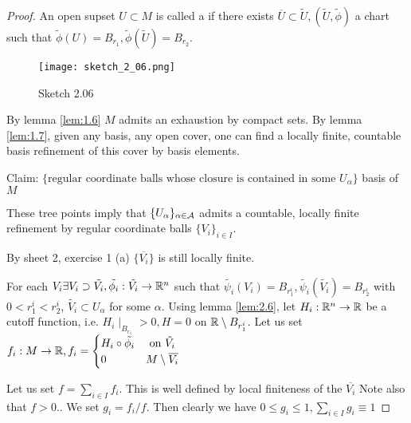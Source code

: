 \begin{proof} %
     An open supset \(U\subset M\) is called a  if there 
    exists \(\overline{U}\subset\tilde{U},(\tilde{U},\tilde{\phi})\) a chart such that 
    \(\tilde{\phi}(U)=B_{r_1},\tilde{\phi}(\tilde{U})=B_{r_2}\). 
    \begin{figure}[H]
        \centering
        \texttt{[image: sketch\_2\_06.png]}
        \caption{Sketch 2.06}
    \end{figure}
    By lemma \ref{lem:1.6} \(M\) admits an exhaustion by compact sets. By lemma \ref{lem:1.7}, given 
    any basis, any open cover, one can find a locally finite, countable basis refinement of this cover by basis elements.

    Claim: \(\{\text{regular coordinate balls whose closure is contained in some }U_\alpha\}\) basis of \(M\) 

    These tree points imply that \(\{U_\alpha\}_{\alpha\in\mathcal{A}}\) admits a countable, locally finite refinement by regular coordinate balls \(\{V_i\}_{i\in I}\).

    By sheet 2, exercise 1 (a) \(\{\overline{V_i}\}\) is still locally finite.

     For each \(V_i\exists V_i\supset \tilde{V_i},\tilde{\phi_i}:\tilde{V_i}\to \mathbb{R}^n\) such that 
    \(\tilde{\psi_i}(V_i)=B_{r_1^i},\tilde{\psi_i}(\tilde{V_i})=B_{r_2^i}\) with \(0<r_1^i<r_2^i\), \(\tilde{V_i}\subset U_\alpha\) for some \(\alpha\).
    Using lemma \ref{lem:2.6}, let \(H_i:\mathbb{R}^n\to \mathbb{R}\) be a cutoff function, i.e. \(H_i\mid_{{B_{r_1}}}>0,H=0\) on \(\mathbb{R}\setminus B_{r_1^i}\).
    Let us set \(f_i:M\to\mathbb{R}, f_i=\begin{cases}
        H_i\circ \tilde{\phi_i} & \text{ on } \tilde{V_i}\\
        0 & M\setminus \overline{{V_i}}
    \end{cases}\)

     Let us set \(f=\sum_{i\in I} f_i\). This is well defined by local finiteness of the \(\overline{V_i}\) Note also that \(f>0\)..
    We set \(g_i=f_i/f\). Then clearly we have \(0\leq g_i\leq 1, \sum_{i\in I} g_i\equiv 1\)


\end{proof}
